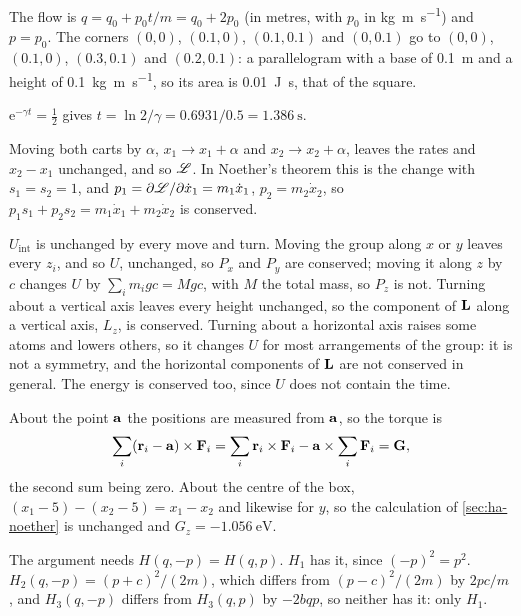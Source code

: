 The flow is $q = q_0 + p_0t/m = q_0 + 2p_0$ (in
metres, with $p_0$ in \si{\kilogram\metre\per\second}) and $p = p_0$. The
corners $(0, 0)$, $(0.1, 0)$, $(0.1, 0.1)$ and $(0, 0.1)$ go to $(0, 0)$,
$(0.1, 0)$, $(0.3, 0.1)$ and $(0.2, 0.1)$: a parallelogram with a base of
\SI{0.1}{\metre} and a height of \SI{0.1}{\kilogram\metre\per\second}, so
its area is \SI{0.01}{\joule\second}, that of the square.

$\mathrm{e}^{-\gamma t} = \frac12$ gives $t = \ln
2/\gamma = 0.6931/0.5 = \SI{1.386}{\second}$.

Moving both carts by $\alpha$, $x_1 \to x_1 +
\alpha$ and $x_2 \to x_2 + \alpha$, leaves the rates and $x_2 - x_1$
unchanged, and so $\mathscr{L}$. In Noether's theorem this is the change with $s_1 = s_2 = 1$,
and $p_1 = \partial\mathscr{L}/\partial\dot{x}_1 = m_1\dot{x}_1$, $p_2 =
m_2\dot{x}_2$, so $p_1s_1 + p_2s_2 = m_1\dot{x}_1 + m_2\dot{x}_2$ is
conserved.

$U_{\mathrm{int}}$ is unchanged by every move
and turn. Moving the group along $x$ or $y$ leaves every $z_i$, and so
$U$, unchanged, so $P_x$ and $P_y$ are conserved; moving it along $z$
by $c$ changes $U$ by $\sum_im_igc = Mgc$, with $M$ the total mass, so
$P_z$ is not. Turning about a vertical axis
leaves every height unchanged, so the component of $\bm{\mathrm{L}}$ along a
vertical axis, $L_z$, is conserved. Turning about a horizontal axis
raises some atoms and lowers others, so it changes $U$ for most
arrangements of the group: it is not a symmetry, and the horizontal
components of $\bm{\mathrm{L}}$ are not conserved in general. The energy is conserved too, since $U$ does not contain the
time.

About the point $\bm{\mathrm{a}}$ the positions are
measured from $\bm{\mathrm{a}}$, so the torque is
\begin{equation*}
   \sum_i(\bm{\mathrm{r}}_i - \bm{\mathrm{a}})\times\bm{\mathrm{F}}_i
   = \sum_i\bm{\mathrm{r}}_i\times\bm{\mathrm{F}}_i - \bm{\mathrm{a}}\times\sum_i\bm{\mathrm{F}}_i
   = \bm{\mathrm{G}} ,
\end{equation*}
the second sum being zero. About the centre of the box,
$(x_1 - 5) - (x_2 - 5) = x_1 - x_2$ and likewise for $y$, so the
calculation of \cref{sec:ha-noether} is unchanged and $G_z =
\SI{-1.056}{\electronvolt}$.

The argument needs $H(q, -p) = H(q, p)$. $H_1$ has
it, since $(-p)^2 = p^2$. $H_2(q, -p) = (p + c)^2/(2m)$, which differs from
$(p - c)^2/(2m)$ by $2pc/m$, and $H_3(q, -p)$ differs from $H_3(q, p)$ by
$-2bqp$, so neither has it: only $H_1$.

